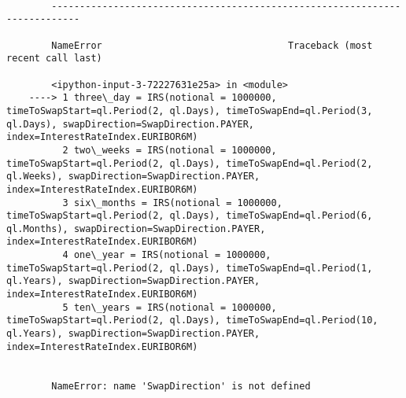     \begin{Verbatim}[commandchars=\\\{\}]

        ---------------------------------------------------------------------------

        NameError                                 Traceback (most recent call last)

        <ipython-input-3-72227631e25a> in <module>
    ----> 1 three\_day = IRS(notional = 1000000, timeToSwapStart=ql.Period(2, ql.Days), timeToSwapEnd=ql.Period(3, ql.Days), swapDirection=SwapDirection.PAYER, index=InterestRateIndex.EURIBOR6M)
          2 two\_weeks = IRS(notional = 1000000, timeToSwapStart=ql.Period(2, ql.Days), timeToSwapEnd=ql.Period(2, ql.Weeks), swapDirection=SwapDirection.PAYER, index=InterestRateIndex.EURIBOR6M)
          3 six\_months = IRS(notional = 1000000, timeToSwapStart=ql.Period(2, ql.Days), timeToSwapEnd=ql.Period(6, ql.Months), swapDirection=SwapDirection.PAYER, index=InterestRateIndex.EURIBOR6M)
          4 one\_year = IRS(notional = 1000000, timeToSwapStart=ql.Period(2, ql.Days), timeToSwapEnd=ql.Period(1, ql.Years), swapDirection=SwapDirection.PAYER, index=InterestRateIndex.EURIBOR6M)
          5 ten\_years = IRS(notional = 1000000, timeToSwapStart=ql.Period(2, ql.Days), timeToSwapEnd=ql.Period(10, ql.Years), swapDirection=SwapDirection.PAYER, index=InterestRateIndex.EURIBOR6M)
    

        NameError: name 'SwapDirection' is not defined

    \end{Verbatim}

